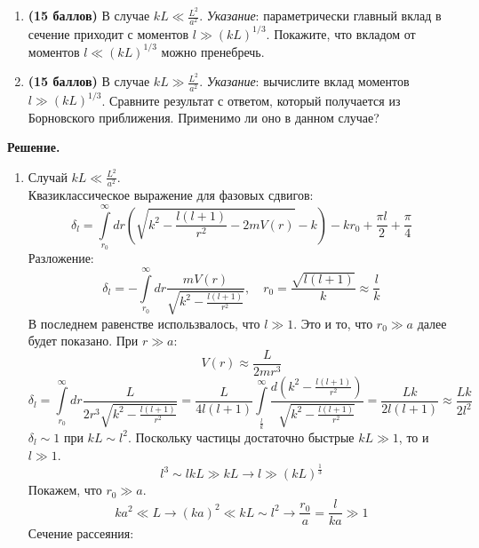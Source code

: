 \documentclass[12pt]{article}
\theoremstyle{definition}
\begin{document}
\begin{enumerate}
    \item \textbf{(15 баллов)} В случае $kL \ll \frac{L^2}{a^2}$. \textit{Указание}: параметрически главный вклад в сечение приходит с моментов $l \gg (kL)^{1/3}$. Покажите, что вкладом от моментов $l \ll (kL)^{1/3}$ можно пренебречь.
    \item \textbf{(15 баллов)} В случае $kL\gg\frac{L^2}{a^2}$. \textit{Указание}: вычислите вклад моментов $l \gg (kL)^{1/3}$. Сравните результат с ответом, который получается из Борновского приближения. Применимо ли оно в данном случае?
\end{enumerate}
\textbf{Решение.}
\begin{enumerate}
    \item Случай $kL\ll\frac{L^2}{a^2}$.\\
    Квазиклассическое выражение для фазовых сдвигов:
    \begin{equation}
        \delta_l=\int\limits_{r_0}^\infty dr\left(\sqrt{k^2-\frac{l(l+1)}{r^2}-2mV(r)}-k\right)-kr_0+\frac{\pi l}{2}+\frac{\pi}{4}
    \end{equation}
    Разложение:
    \begin{equation}
        \delta_l=-\int\limits_{r_0}^\infty dr\frac{mV(r)}{\sqrt{k^2-\frac{l(l+1)}{r^2}}},\quad r_0=\frac{\sqrt{l(l+1)}}{k}\approx\frac{l}{k}
    \end{equation}
    В последнем равенстве использвалось, что $l\gg1$. Это и то, что $r_0\gg a$ далее будет показано. При $r\gg a$:
    \begin{equation}
        V(r)\approx\frac{L}{2mr^3}
    \end{equation}
    \begin{equation}
        \delta_l=\int\limits_{r_0}^\infty dr\frac{L}{2r^3\sqrt{k^2-\frac{l(l+1)}{r^2}}}=\frac{L}{4l(l+1)}\int\limits_{\frac{l}{k}}^\infty\frac{d(k^2-\frac{l(l+1)}{r^2})}{\sqrt{k^2-\frac{l(l+1)}{r^2}}}=\frac{Lk}{2l(l+1)}\approx\frac{Lk}{2l^2}
    \end{equation}
    $\delta_l\sim1$ при $kL\sim l^2$. Поскольку частицы достаточно быстрые $kL\gg1$, то и $l\gg1$.
    \begin{equation}
        l^3\sim lkL\gg kL\rightarrow l\gg(kL)^\frac{1}{3}
    \end{equation}
    Покажем, что $r_0\gg a$.
    \begin{equation}
        ka^2\ll L\rightarrow (ka)^2\ll kL\sim l^2\rightarrow\frac{r_0}{a}=\frac{l}{ka}\gg1
    \end{equation}
    Сечение рассеяния:

\end{enumerate}
\end{document}
